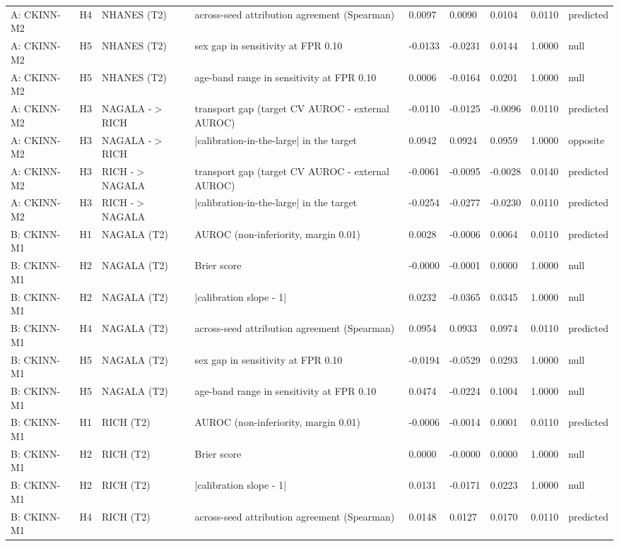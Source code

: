 \begin{table}[ht]
\begin{tabular}{lllllllll}
A: CKINN-M2 & H4 & NHANES (T2) & across-seed attribution agreement (Spearman) & 0.0097 & 0.0090 & 0.0104 & 0.0110 & predicted \\
A: CKINN-M2 & H5 & NHANES (T2) & sex gap in sensitivity at FPR 0.10 & -0.0133 & -0.0231 & 0.0144 & 1.0000 & null \\
A: CKINN-M2 & H5 & NHANES (T2) & age-band range in sensitivity at FPR 0.10 & 0.0006 & -0.0164 & 0.0201 & 1.0000 & null \\
A: CKINN-M2 & H3 & NAGALA -$>$ RICH & transport gap (target CV AUROC - external AUROC) & -0.0110 & -0.0125 & -0.0096 & 0.0110 & predicted \\
A: CKINN-M2 & H3 & NAGALA -$>$ RICH & |calibration-in-the-large| in the target & 0.0942 & 0.0924 & 0.0959 & 1.0000 & opposite \\
A: CKINN-M2 & H3 & RICH -$>$ NAGALA & transport gap (target CV AUROC - external AUROC) & -0.0061 & -0.0095 & -0.0028 & 0.0140 & predicted \\
A: CKINN-M2 & H3 & RICH -$>$ NAGALA & |calibration-in-the-large| in the target & -0.0254 & -0.0277 & -0.0230 & 0.0110 & predicted \\
B: CKINN-M1 & H1 & NAGALA (T2) & AUROC (non-inferiority, margin 0.01) & 0.0028 & -0.0006 & 0.0064 & 0.0110 & predicted \\
B: CKINN-M1 & H2 & NAGALA (T2) & Brier score & -0.0000 & -0.0001 & 0.0000 & 1.0000 & null \\
B: CKINN-M1 & H2 & NAGALA (T2) & |calibration slope - 1| & 0.0232 & -0.0365 & 0.0345 & 1.0000 & null \\
B: CKINN-M1 & H4 & NAGALA (T2) & across-seed attribution agreement (Spearman) & 0.0954 & 0.0933 & 0.0974 & 0.0110 & predicted \\
B: CKINN-M1 & H5 & NAGALA (T2) & sex gap in sensitivity at FPR 0.10 & -0.0194 & -0.0529 & 0.0293 & 1.0000 & null \\
B: CKINN-M1 & H5 & NAGALA (T2) & age-band range in sensitivity at FPR 0.10 & 0.0474 & -0.0224 & 0.1004 & 1.0000 & null \\
B: CKINN-M1 & H1 & RICH (T2) & AUROC (non-inferiority, margin 0.01) & -0.0006 & -0.0014 & 0.0001 & 0.0110 & predicted \\
B: CKINN-M1 & H2 & RICH (T2) & Brier score & 0.0000 & -0.0000 & 0.0000 & 1.0000 & null \\
B: CKINN-M1 & H2 & RICH (T2) & |calibration slope - 1| & 0.0131 & -0.0171 & 0.0223 & 1.0000 & null \\
B: CKINN-M1 & H4 & RICH (T2) & across-seed attribution agreement (Spearman) & 0.0148 & 0.0127 & 0.0170 & 0.0110 & predicted \\

\end{tabular}
\end{table}
